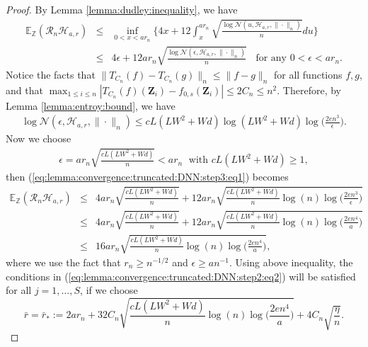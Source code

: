 \documentclass[11pt, preprint]{imsart}
\numberwithin{equation}{section}
\def \mcH{\mathcal{H}}
\def \mcRn{\mathcal{R}_n}
\def \mcN{\mathcal{N}}
\def \bfZ{\mathbf{Z}}
\def \ev{\mathbb{E}}
\theoremstyle{plain}
\theoremstyle{definition}
\begin{document}
\begin{proof}
By Lemma \ref{lemma:dudley:inequality}, we have
\begin{eqnarray}
	\ev_{\mathbb{Z}}(\mcRn\mcH_{a,r})&\leq& \inf_{0<x<ar_n}\bigg\{4x+12\int_{x}^{ar_n}\sqrt{\frac{\log \mcN(u, \mcH_{a,r}, \|\cdot\|_n)}{n}}du\bigg\}\nonumber\\
	&\leq& 4\epsilon+12ar_n\sqrt{\frac{\log \mcN(\epsilon, \mcH_{a,r}, \|\cdot\|_n)}{n}} \;\;\textrm{ for any } 0<\epsilon<ar_n.\label{eq:lemma:convergence:truncated:DNN:step3:eq1}
\end{eqnarray}
Notice the facts that $\|T_{C_n}(f)-T_{C_n}(g)\|_n\leq \|f-g\|_n$ for all functions $f, g$, and that $\max_{1\leq i\leq n}|T_{C_n}(f)(\bfZ_i)-f_{0,s}(\bfZ_i)|\leq 2C_n\leq n^2$. Therefore, by Lemma \ref{lemma:entroy:bound}, we have
\begin{eqnarray}
	\log \mcN(\epsilon, \mcH_{a,r}, \|\cdot\|_n)\leq cL(LW^2+Wd)\log(LW^2+Wd)\log\bigg(\frac{2en^3}{\epsilon}\bigg).\nonumber
\end{eqnarray}
Now we choose 
\begin{eqnarray}
	\epsilon=ar_n\sqrt{\frac{cL(LW^2+Wd)}{n}}<ar_n\;\textrm{ with } cL(LW^2+Wd)\geq 1,\nonumber
\end{eqnarray}
then (\ref{eq:lemma:convergence:truncated:DNN:step3:eq1}) becomes
\begin{eqnarray}
	\ev_{\mathbb{Z}}(\mcRn\mcH_{a,r})&\leq& 4ar_n\sqrt{\frac{cL(LW^2+Wd)}{n}}+12ar_n\sqrt{\frac{cL(LW^2+Wd)}{n}\log(n)\log\bigg(\frac{2en^3}{\epsilon}\bigg)}\nonumber\\
	&\leq&4ar_n\sqrt{\frac{cL(LW^2+Wd)}{n}}+12ar_n\sqrt{\frac{cL(LW^2+Wd)}{n}\log(n)\log\bigg(\frac{2en^4}{a}\bigg)}\nonumber\\
	&\leq&16ar_n\sqrt{\frac{cL(LW^2+Wd)}{n}\log(n)\log\bigg(\frac{2en^4}{a}\bigg)}\nonumber,
\end{eqnarray}
where we use the fact that $r_n\geq n^{-1/2}$ and $\epsilon\geq an^{-1}$. Using above inequality, the conditions in (\ref{eq:lemma:convergence:truncated:DNN:step2:eq2}) will be satisfied for all $j=1,\ldots, S$, if we choose
\begin{equation}
\bar{r}=\bar{r}_*:=2ar_n+32C_n\sqrt{\frac{cL(LW^2+Wd)}{n}\log(n)\log\bigg(\frac{2en^4}{a}\bigg)}+4C_n\sqrt{\frac{\eta}{n}}.\nonumber
\end{equation}


\end{proof}
\end{document}

